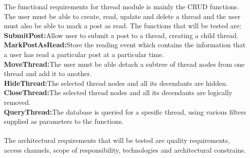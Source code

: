 
The functional requirements for thread module is mainly the CRUD functions. The user must be able to create, read, update and delete a thread and the user must also be able to mark a post as read. The functions that will be tested are:\\
\textbf{ SubmitPost:}Allow user to submit a post to a thread, creating a child thread.\\
\textbf{ MarkPostAsRead:}Store the reading event which contains the information that a user has read a particular post at a particular time.\\
\textbf{ MoveThread:}The user must be able detach a subtree of thread nodes from one thread and add it to another.\\
\textbf{ HideThread:}The selected thread nodes and all its decendants are hidden.\\
\textbf{ CloseThread:}The selected thread nodes and all its decendants are logically removed.\\
\textbf{ QueryThread:}The database is queried for a spesific thread, using various filters supplied as parameters to the functions.\\
\\
The architectural requirements that will be tested are quality requirements, access channels, scope of responsibility, technologies and architectural constrains.\\

